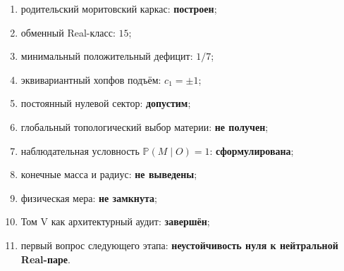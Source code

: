 \begin{protocol}
\begin{enumerate}
 \item родительский моритовский каркас: \textbf{построен};
 \item обменный Real-класс: \textbf{$15$};
 \item минимальный положительный дефицит: \textbf{$1/7$};
 \item эквивариантный хопфов подъём: \textbf{$c_1=\pm1$};
 \item постоянный нулевой сектор: \textbf{допустим};
 \item глобальный топологический выбор материи: \textbf{не получен};
 \item наблюдательная условность $\mathbb P(M\mid O)=1$:
 \textbf{сформулирована};
 \item конечные масса и радиус: \textbf{не выведены};
 \item физическая мера: \textbf{не замкнута};
 \item Том V как архитектурный аудит: \textbf{завершён};
 \item первый вопрос следующего этапа:
 \textbf{неустойчивость нуля к нейтральной Real-паре}.
\end{enumerate}
\end{protocol}